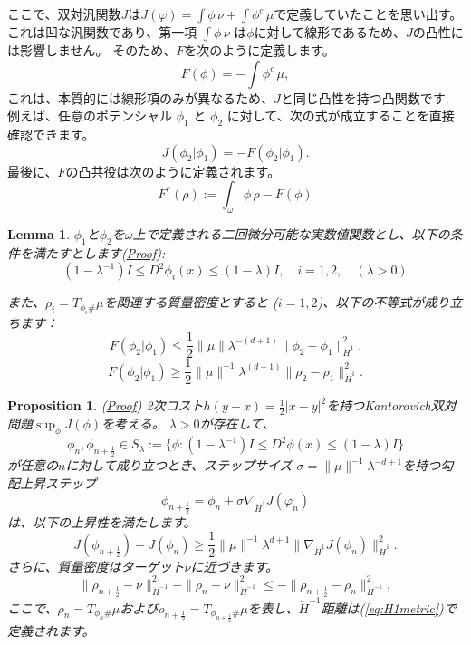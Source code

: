 \documentclass{jsarticle}
\newtheorem{lem}[thm]{Lemma}
\newtheorem{prop}[thm]{Proposition}
\theoremstyle{definition}
\begin{document}
ここで、双対汎関数$J$は$J(\varphi) =  \int \phi\, \nu  + \int \phi^c \, \mu$で定義していたことを思い出す。
{\color{teal}
これは凹な汎関数であり、第一項 $\int \phi\, \nu$ は$\phi$に対して線形であるため、$J$の凸性には影響しません。
}
そのため、$F$を次のように定義します。
\begin{equation}
  \label{eq:F(phi)}
    F(\phi) = - \int \phi^c \, \mu,
\end{equation}
これは、本質的には線形項のみが異なるため、$J$と同じ凸性を持つ凸関数です.
例えば、任意のポテンシャル $\phi_1$ と $\phi_2$ に対して、次の式が成立することを直接確認できます。
{\color{teal}
\begin{equation}
  \label{eq:J-F}
  J(\phi_2|\phi_1) = -F(\phi_2|\phi_1).
\end{equation}
}
最後に、$F$の凸共役は次のように定義されます。
\begin{equation}
    F^*(\rho) := \int_\omega \phi \, \rho - F(\phi)
\end{equation}

\begin{lem}
  \label{lem:stability estimates}
  $\phi_1$と$\phi_2$を$\omega$上で定義される二回微分可能な実数値関数とし、以下の条件を満たすとします(\hyperlink{proof:lem:stability estimates}{Proof}):
  $$
    (1-\lambda^{-1})I \leq D^2\phi_i(x) \leq (1-\lambda)I, \quad i = 1, 2, \quad (\lambda > 0)
  $$

  また、$\rho_i = T_{\phi_i \#} \mu$を関連する質量密度とすると ($i = 1, 2$)、以下の不等式が成り立ちます：
  \begin{equation}
    \label{eq:F_upper bound}
    F(\phi_2 | \phi_1) \leq \frac{1}{2}\|\mu\|\lambda^{-(d+1)}\|\phi_2 - \phi_1\|^{2}_{\dot{H}^1}. 
  \end{equation}
  \begin{equation}
    \label{eq:F_lower bound}
    F(\phi_2 | \phi_1) \geq \frac{1}{2}\|\mu\|^{-1}\lambda^{(d+1)}\|\rho_2 - \rho_1\|_{\dot{H}^1}^2.
  \end{equation}
\end{lem}

\begin{prop}
  \label{prop:勾配上昇保持}
  (\hyperlink{proof:prop:勾配上昇保持}{Proof})
  2次コスト$h(y-x)=\frac{1}{2}|x-y|^2$を持つKantorovich双対問題$\sup_{\phi}J(\phi)$を考える。
  $\lambda>0$が存在して、
  $$
  \phi_n, \phi_{n + \frac{1}{2}} \in S_{\lambda}:=\{\phi:(1-\lambda^{-1})I \leq D^2\phi(x) \leq (1-\lambda)I\}
  $$
  が任意の$n$に対して成り立つとき、ステップサイズ
  $\sigma = \|\mu\|^{-1}\lambda^{-d+1}$を持つ勾配上昇ステップ
  $$
  \phi_{n+\frac{1}{2}} = \phi_n + \sigma \nabla_{\dot{H}^1} J(\varphi_n)
  $$
  は、以下の上昇性を満たします。
  $$
  J(\phi_{n + \frac{1}{2}})-J(\phi_n) \geq \frac{1}{2}{\|\mu\|^{-1}\lambda^{d+1}}\|\nabla_{\dot{H}^1} J(\phi_n)\|_{\dot{H}^1}^2.
  $$
  さらに、質量密度はターゲット$\nu$に近づきます。
  $$
  \|\rho_{n + \frac{1}{2}} - \nu\|_{\dot{H}^{-1}}^2 - \|\rho_n - \nu\|_{\dot{H}^{-1}}^2 \leq -\|\rho_{n + \frac{1}{2}} - \rho_n\|_{\dot{H}^{-1}}^2,
  $$
  ここで、$\rho_n = T_{\phi_n \#}\mu$および$\rho_{n+\frac{1}{2}} = T_{\phi_{n+\frac{1}{2}} \#}\mu$を表し、$\dot{H}^{-1}$距離は(\ref{eq:H1metric})で定義されます。

\end{prop}
\end{document}
